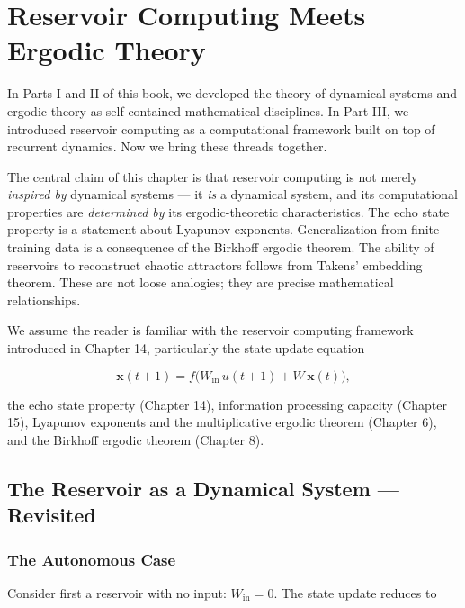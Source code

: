 \chapter{Reservoir Computing Meets Ergodic Theory}\label{ch:16}

In Parts I and II of this book, we developed the theory of dynamical systems and ergodic theory as self-contained mathematical disciplines. In Part III, we introduced reservoir computing as a computational framework built on top of recurrent dynamics. Now we bring these threads together.

The central claim of this chapter is that reservoir computing is not merely \textit{inspired by} dynamical systems --- it \textit{is} a dynamical system, and its computational properties are \textit{determined by} its ergodic-theoretic characteristics. The echo state property is a statement about Lyapunov exponents. Generalization from finite training data is a consequence of the Birkhoff ergodic theorem. The ability of reservoirs to reconstruct chaotic attractors follows from Takens' embedding theorem. These are not loose analogies; they are precise mathematical relationships.

We assume the reader is familiar with the reservoir computing framework introduced in Chapter 14, particularly the state update equation

\begin{equation}\label{eq:16.1}\tag{16.1}
\mathbf{x}(t+1) = f\bigl(W_{\text{in}}\, u(t+1) + W\, \mathbf{x}(t)\bigr),
\end{equation}

the echo state property (Chapter 14), information processing capacity (Chapter 15), Lyapunov exponents and the multiplicative ergodic theorem (Chapter 6), and the Birkhoff ergodic theorem (Chapter 8).


\bigskip


\section{The Reservoir as a Dynamical System — Revisited}\label{sec:16.1}

\subsection{The Autonomous Case}\label{sec:16.1.1}

Consider first a reservoir with no input: $W_{\text{in}} = 0$. The state update reduces to

